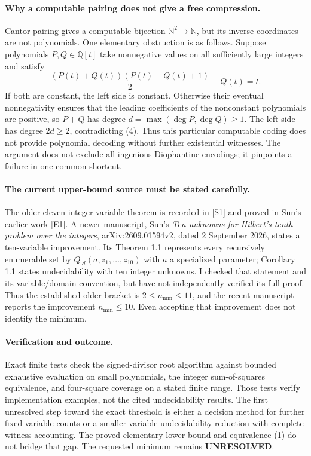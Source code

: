 \documentclass[11pt]{article}
\begin{document}
\paragraph{Why a computable pairing does not give a free compression.}
Cantor pairing gives a computable bijection $\mathbb N^2\to\mathbb N$,
but its inverse coordinates are not polynomials. One elementary
obstruction is as follows. Suppose polynomials $P,Q\in\mathbb Q[t]$
take nonnegative values on all sufficiently large integers and satisfy
\[
 \frac{(P(t)+Q(t))(P(t)+Q(t)+1)}2+Q(t)=t.              \tag{4}
\]
If both are constant, the left side is constant. Otherwise their
eventual nonnegativity ensures that the leading coefficients of the
nonconstant polynomials are positive, so $P+Q$ has degree
$d=\max(\deg P,\deg Q)\ge1$. The left side has degree $2d\ge2$,
contradicting (4). Thus this particular computable coding does not
provide polynomial decoding without further existential witnesses.
The argument does not exclude all ingenious Diophantine encodings;
it pinpoints a failure in one common shortcut.

\paragraph{The current upper-bound source must be stated carefully.}
The older eleven-integer-variable theorem is recorded in [S1] and
proved in Sun's earlier work [E1]. A newer manuscript, Sun's
\emph{Ten unknowns for Hilbert's tenth problem over the integers},
arXiv:2609.01594v2, dated 2 September 2026, states a ten-variable
improvement. Its Theorem 1.1 represents every recursively enumerable
set by $Q_{\mathcal A}(a,z_1,\ldots,z_{10})$ with $a$ a specialized
parameter; Corollary 1.1 states undecidability with ten integer
unknowns. I checked that statement and its variable/domain convention,
but have not independently verified its full proof. Thus the
established older bracket is $2\le n_{\min}\le11$, and the recent
manuscript reports the improvement $n_{\min}\le10$. Even accepting
that improvement does not identify the minimum.

\paragraph{Verification and outcome.}
Exact finite tests check the signed-divisor root algorithm against
bounded exhaustive evaluation on small polynomials, the integer
sum-of-squares equivalence, and four-square coverage on a stated finite
range. Those tests verify implementation examples, not the cited
undecidability results. The first unresolved step toward the exact
threshold is either a decision method for further fixed variable
counts or a smaller-variable undecidability reduction with complete
witness accounting. The proved elementary lower bound and equivalence
(1) do not bridge that gap. The requested minimum remains
\textbf{UNRESOLVED}.
\end{document}
